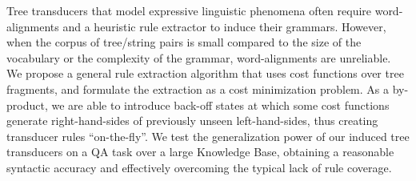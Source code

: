 Tree transducers that model expressive linguistic phenomena often require word-alignments and a heuristic rule extractor to induce their grammars. However, when the corpus of tree/string pairs is small compared to the size of the vocabulary or the complexity of the grammar, word-alignments are unreliable.  We propose a general rule extraction algorithm that uses cost functions over tree fragments, and formulate the extraction as a cost minimization problem.  As a by-product, we are able to introduce back-off states at which some cost functions generate right-hand-sides of previously unseen left-hand-sides, thus creating transducer rules ``on-the-fly''. We test the generalization power of our induced tree transducers on a QA task over a large Knowledge Base, obtaining a reasonable syntactic accuracy and effectively overcoming the typical lack of rule coverage.
